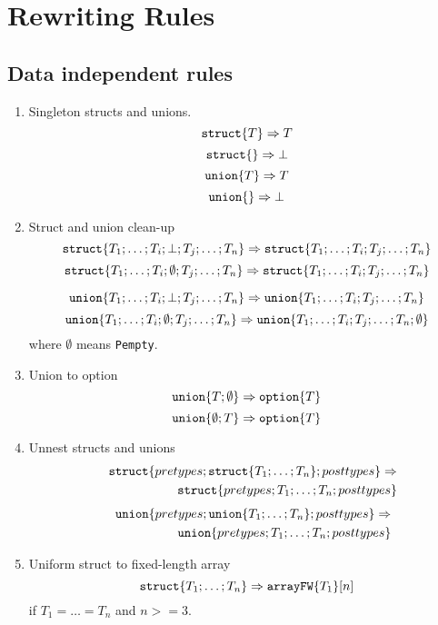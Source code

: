 \documentclass[fleqn]{article}
\newcommand{\struct}[1]{{\tt struct}\{#1\}}
\newcommand{\union}[1]{{\tt union}\{#1\}}
\newcommand{\arrayFW}[2]{{\tt arrayFW}\{#1\}[#2]}
\newcommand{\option}[1]{{\tt option}\{#1\}}
\newcommand{\goto}{\Rightarrow}
\begin{document}
\section{Rewriting Rules}
\subsection*{Data independent rules}
\begin{enumerate}
\item Singleton structs and unions.
\[
\struct{T} \goto T
\]
\[
\struct{} \goto \bot 
\]
\[
\union{T} \goto T
\]
\[
\union{} \goto \bot 
\]

\item Struct and union clean-up
\[
\struct{T_1; \ldots; T_i; \bot; T_j; \ldots; T_n} \goto
\struct{T_1; \ldots; T_i; T_j; \ldots; T_n} 
\] 
\[
\struct{T_1; \ldots; T_i; \emptyset; T_j; \ldots; T_n} \goto
\struct{T_1; \ldots; T_i; T_j; \ldots; T_n} 
\] 

\[
\union{T_1; \ldots; T_i; \bot; T_j; \ldots; T_n} \goto
\union{T_1; \ldots; T_i; T_j; \ldots; T_n} 
\] 
\[
\union{T_1; \ldots; T_i; \emptyset; T_j; \ldots; T_n} \goto
\union{T_1; \ldots; T_i; T_j; \ldots; T_n; \emptyset} 
\]
\noindent where $\emptyset$ means {\tt Pempty}.

\item Union to option
\[
\union{T; \emptyset} \goto \option{T}
\]
\[
\union{\emptyset; T} \goto \option{T}
\]

\item Unnest structs and unions
\begin{eqnarray*}
&& \struct{pretypes; \struct{T_1; \ldots; T_n}; posttypes} \goto \\
&& \struct{pretypes; T_1; \ldots; T_n; posttypes}
\end{eqnarray*}
\begin{eqnarray*}
&&\union{pretypes; \union{T_1; \ldots; T_n}; posttypes} \goto \\
&&\union{pretypes; T_1; \ldots; T_n; posttypes}
\end{eqnarray*}

\item Uniform struct to fixed-length array
\[
\struct{T_1; \ldots; T_n} \goto \arrayFW{T_1}{n}
\]
\noindent if $T_1 = \ldots = T_n$ and $n>=3$.


\end{enumerate}
\end{document}
